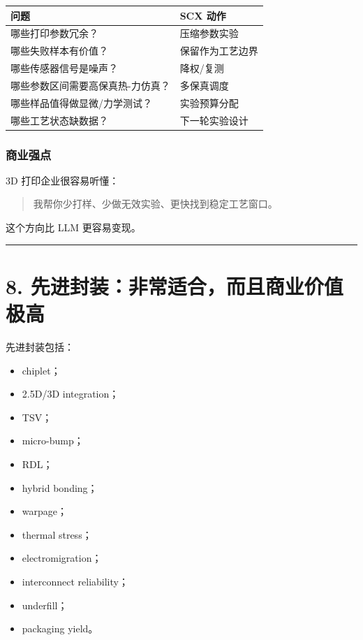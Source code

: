 \documentclass[
  12pt,
]{ctexart}
\providecommand{\tightlist}{%
  \setlength{\itemsep}{0pt}\setlength{\parskip}{0pt}}
\begin{document}
\begin{longtable}[]{@{}ll@{}}
\toprule\noalign{}
问题 & SCX 动作 \\
\midrule\noalign{}
\endhead
\bottomrule\noalign{}
\endlastfoot
哪些打印参数冗余？ & 压缩参数实验 \\
哪些失败样本有价值？ & 保留作为工艺边界 \\
哪些传感器信号是噪声？ & 降权/复测 \\
哪些参数区间需要高保真热-力仿真？ & 多保真调度 \\
哪些样品值得做显微/力学测试？ & 实验预算分配 \\
哪些工艺状态缺数据？ & 下一轮实验设计 \\
\end{longtable}

\subsubsection{商业强点}\label{ux5546ux4e1aux5f3aux70b9}

3D 打印企业很容易听懂：

\begin{quote}
我帮你少打样、少做无效实验、更快找到稳定工艺窗口。
\end{quote}

这个方向比 LLM 更容易变现。

\begin{center}\rule{0.5\linewidth}{0.5pt}\end{center}

\section{8.
先进封装：非常适合，而且商业价值极高}\label{ux5148ux8fdbux5c01ux88c5ux975eux5e38ux9002ux5408ux800cux4e14ux5546ux4e1aux4ef7ux503cux6781ux9ad8}

先进封装包括：

\begin{itemize}
\tightlist
\item
  chiplet；
\item
  2.5D/3D integration；
\item
  TSV；
\item
  micro-bump；
\item
  RDL；
\item
  hybrid bonding；
\item
  warpage；
\item
  thermal stress；
\item
  electromigration；
\item
  interconnect reliability；
\item
  underfill；
\item
  packaging yield。
\end{itemize}
\end{document}

